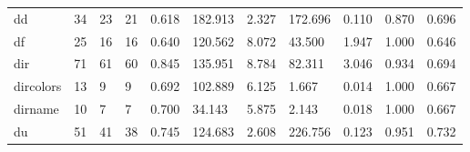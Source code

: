 \begin{longtable}{lp{1.8cm}p{1.8cm}p{1.8cm}p{1.8cm}p{1.8cm}p{1.8cm}p{1.8cm}p{1.8cm}p{1.8cm}p{1.8cm}}
dd        &                           34 &                 23 &                                21 &                                      0.618 &                                182.913 &                                        2.327 &                           172.696 &                                   0.110 &                              0.870 &                                              0.696 \\
df        &                           25 &                 16 &                                16 &                                      0.640 &                                120.562 &                                        8.072 &                            43.500 &                                   1.947 &                              1.000 &                                              0.646 \\
dir       &                           71 &                 61 &                                60 &                                      0.845 &                                135.951 &                                        8.784 &                            82.311 &                                   3.046 &                              0.934 &                                              0.694 \\
dircolors &                           13 &                  9 &                                 9 &                                      0.692 &                                102.889 &                                        6.125 &                             1.667 &                                   0.014 &                              1.000 &                                              0.667 \\
dirname   &                           10 &                  7 &                                 7 &                                      0.700 &                                 34.143 &                                        5.875 &                             2.143 &                                   0.018 &                              1.000 &                                              0.667 \\
du        &                           51 &                 41 &                                38 &                                      0.745 &                                124.683 &                                        2.608 &                           226.756 &                                   0.123 &                              0.951 &                                              0.732 \\

\end{longtable}
